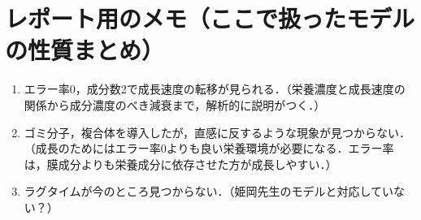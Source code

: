\documentclass[a4paper,11pt]{jsarticle}
\begin{document}
\newpage
\section{レポート用のメモ（ここで扱ったモデルの性質まとめ）}

\begin{enumerate}
  \item エラー率0，成分数2で成長速度の転移が見られる．（栄養濃度と成長速度の関係から成分濃度のべき減衰まで，解析的に説明がつく．）
  \item ゴミ分子，複合体を導入したが，直感に反するような現象が見つからない．（成長のためにはエラー率0よりも良い栄養環境が必要になる．エラー率は，膜成分よりも栄養成分に依存させた方が成長しやすい．）
  \item ラグタイムが今のところ見つからない．（姫岡先生のモデルと対応していない？）
\end{enumerate}
\end{document}
